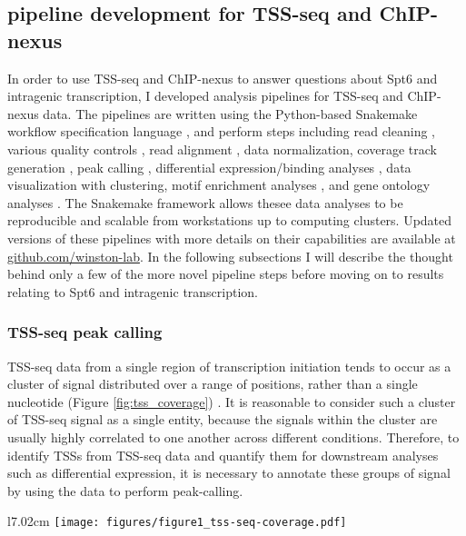 \documentclass[9pt, letterpaper]{article}
\begin{document}
\subsection{pipeline development for TSS-seq and ChIP-nexus}

In order to use TSS-seq and ChIP-nexus to answer questions about Spt6 and intragenic transcription, I developed analysis pipelines for TSS-seq and ChIP-nexus data. The pipelines are written using the Python-based Snakemake workflow specification language \cite{koster2012}, and perform steps including read cleaning \cite{martin2011}, various quality controls \cite{andrews2012}, read alignment \cite{kim2013, langmead2012}, data normalization, coverage track generation \cite{quinlan2010}, peak calling \cite{zhang2008}, differential expression/binding analyses \cite{love2014}, data visualization with clustering, motif enrichment analyses \cite{bailey2015}, and gene ontology analyses \cite{young2010}. The Snakemake framework allows thesee data analyses to be reproducible and scalable from workstations up to computing clusters. Updated versions of these pipelines with more details on their capabilities are available at \href{https://github.com/winston-lab}{github.com/winston-lab}. In the following subsections I will describe the thought behind only a few of the more novel pipeline steps before moving on to results relating to Spt6 and intragenic transcription.

\subsubsection{TSS-seq peak calling}

TSS-seq data from a single region of transcription initiation tends to occur as a cluster of signal distributed over a range of positions, rather than a single nucleotide (Figure \ref{fig:tss_coverage}) \cite{arribere2013, malabat2015}. It is reasonable to consider such a cluster of TSS-seq signal as a single entity, because the signals within the cluster are usually highly correlated to one another across different conditions. Therefore, to identify TSSs from TSS-seq data and quantify them for downstream analyses such as differential expression, it is necessary to annotate these groups of signal by using the data to perform peak-calling.

\begin{wrapfigure}[12]{l}{7.02cm}
\centering
\texttt{[image: figures/figure1\_tss-seq-coverage.pdf]}
\caption{Wild-type sense strand TSS-seq signal at the \textit{TEF1} genic TSS. Normalized counts are the mean of spike-in normalized coverage from two replicates.}
\label{fig:tss_coverage}
\end{wrapfigure}
\end{document}
